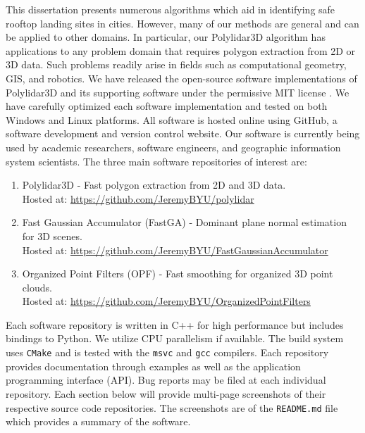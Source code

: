 This dissertation presents numerous algorithms which aid in identifying safe rooftop landing sites in cities. However, many of our methods are general and can be applied to other domains. In particular, our Polylidar3D algorithm has applications to any problem domain that requires polygon extraction from 2D or 3D data. Such problems readily arise in fields such as computational geometry, \ac{GIS}, and robotics. We have released the open-source software implementations of Polylidar3D and its supporting software under the permissive MIT license \cite{saltzer_origin_2020}. We have carefully optimized each software implementation and tested on both Windows and Linux platforms. All software is hosted online using GitHub, a software development and version control website. Our software is currently being used by academic researchers, software engineers, and geographic information system scientists.  The three main software repositories of interest are:

\begin{enumerate}
    \item Polylidar3D - Fast polygon extraction from 2D and 3D data. \\ Hosted at: \url{https://github.com/JeremyBYU/polylidar}
    \item Fast Gaussian Accumulator (FastGA) - Dominant plane normal estimation for 3D scenes. \\  Hosted at: \url{https://github.com/JeremyBYU/FastGaussianAccumulator}
    \item Organized Point Filters (OPF) - Fast smoothing for organized 3D point clouds.
    \\  Hosted at: \url{https://github.com/JeremyBYU/OrganizedPointFilters}
\end{enumerate}

Each software repository is written in C++ for high performance but includes bindings to Python. We utilize CPU parallelism if available. The build system uses \texttt{CMake} and is tested with the \texttt{msvc} and \texttt{gcc} compilers. Each repository provides documentation through examples as well as the application programming interface (API). Bug reports may be filed at each individual repository. Each section below will provide multi-page screenshots of their respective source code repositories. The screenshots are of the \texttt{README.md} file which provides a summary of the software.

\newpage


